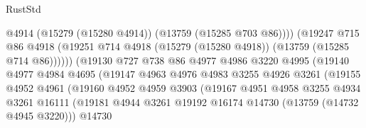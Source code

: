 \begin{lexlean}{RustStd}
\begin{coremodule}
                                          @4914
                                          (@15279 (@15280 @4914))
                                          (@13759 (@15285 @703 @86))))
                                      (@19247
                                        @715
                                        @86
                                        @4918
                                        (@19251
                                          @714
                                          @4918
                                          (@15279 (@15280 @4918))
                                          (@13759 (@15285 @714 @86))))))
                                  (@19130
                                    @727
                                    @738
                                    @86
                                    @4977
                                    @4986
                                    @3220
                                    @4995
                                    (@19140
                                      @4977
                                      @4984
                                      @4695
                                      (@19147
                                        @4963
                                        @4976
                                        @4983
                                        @3255
                                        @4926
                                        @3261
                                        (@19155
                                          @4952
                                          @4961
                                          (@19160
                                            @4952
                                            @4959
                                            @3903
                                            (@19167
                                              @4951
                                              @4958
                                              @3255
                                              @4934
                                              @3261
                                              @16111
                                              (@19181
                                                @4944
                                                @3261
                                                @19192
                                                @16174
                                                @14730
                                                (@13759 (@14732 @4945 @3220)))
                                              @14730

\end{coremodule}
\end{lexlean}
